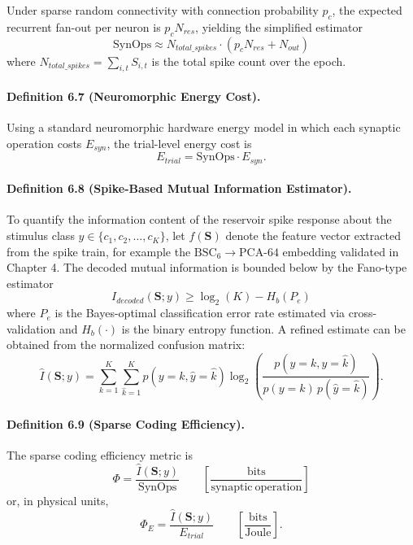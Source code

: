 Under sparse random connectivity with connection probability $p_c$, the expected recurrent fan-out per neuron is $p_cN_{res}$, yielding the simplified estimator
\begin{equation}
\mathrm{SynOps} \approx N_{total\_spikes}\cdot (p_cN_{res}+N_{out})
\end{equation}
where $N_{total\_spikes}=\sum_{i,t} S_{i,t}$ is the total spike count over the epoch.

\paragraph{Definition 6.7 (Neuromorphic Energy Cost).}
Using a standard neuromorphic hardware energy model in which each synaptic operation costs $E_{syn}$, the trial-level energy cost is
\begin{equation}
E_{trial}=\mathrm{SynOps}\cdot E_{syn}. 
\end{equation}

\paragraph{Definition 6.8 (Spike-Based Mutual Information Estimator).}
To quantify the information content of the reservoir spike response about the stimulus class $y\in\{c_1,c_2,\ldots,c_K\}$, let $f(\mathbf{S})$ denote the feature vector extracted from the spike train, for example the $\mathrm{BSC}_6 \rightarrow \mathrm{PCA}\text{-}64$ embedding validated in Chapter 4. The decoded mutual information is bounded below by the Fano-type estimator
\begin{equation}
I_{decoded}(\mathbf{S};y) \ge \log_2(K) - H_b(P_e)
\end{equation}
where $P_e$ is the Bayes-optimal classification error rate estimated via cross-validation and $H_b(\cdot)$ is the binary entropy function. A refined estimate can be obtained from the normalized confusion matrix:
\begin{equation}
\hat{I}(\mathbf{S};y)=\sum_{k=1}^{K}\sum_{\hat{k}=1}^{K} p(y=k,\hat{y}=\hat{k})\log_2\!\left(\frac{p(y=k,\hat{y}=\hat{k})}{p(y=k)\,p(\hat{y}=\hat{k})}\right).
\end{equation}

\paragraph{Definition 6.9 (Sparse Coding Efficiency).}
The sparse coding efficiency metric is
\begin{equation}
\Phi = \frac{\hat{I}(\mathbf{S};y)}{\mathrm{SynOps}} \qquad \left[\frac{\mathrm{bits}}{\mathrm{synaptic\ operation}}\right]
\end{equation}
or, in physical units,
\begin{equation}
\Phi_E = \frac{\hat{I}(\mathbf{S};y)}{E_{trial}} \qquad \left[\frac{\mathrm{bits}}{\mathrm{Joule}}\right].
\end{equation}

